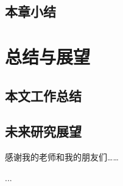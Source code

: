 \documentclass[lang=chs, degree=master, blindreview=false, adobe=false]{yanputhesis}
\begin{document}
\section{本章小结}

\chapter{总结与展望}
\section{本文工作总结}
\section{未来研究展望}

\cleardoublepage
\appendix

\backmatter                                                 %
\begin{acknowledgements}                                    %
感谢我的老师和我的朋友们……
\end{acknowledgements}                                      %
\begin{accomplishments}                                     %
    [1] ...
\end{accomplishments}                                       %
\makestatement                                              %
\end{document}
